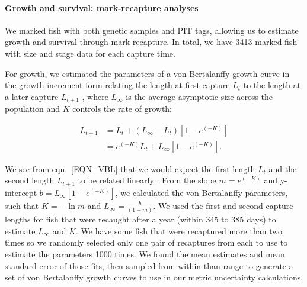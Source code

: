\documentclass[12pt, oneside]{article}   	%
\begin{document}
\paragraph*{Growth and survival: mark-recapture analyses}

We marked fish with both genetic samples and PIT tags, allowing us to estimate growth and survival through mark-recapture. In total, we have 3413 marked fish with size and stage data for each capture time. 

For growth, we estimated the parameters of a von Bertalanffy growth curve \citep{fabens1965properties} in the growth increment form relating the length at first capture $L_t$ to the length at a later capture $L_{t+1}$ \citep{hart2009estimating}, where $L_\infty$ is the average asymptotic size across the population and $K$ controls the rate of growth: %

\begin{equation} \label{EQN_VBL} 
\begin{split}
L_{t+1} & = L_t + (L_\infty - L_t)[1 - e^{(-K)}] \\
 & = e^{(-K)}L_t + L_\infty[1 - e^{(-K)}].
\end{split}
\end{equation}

We see from eqn.\ \ref{EQN_VBL} that we would expect the first length $L_t$ and the second length $L_{t+1}$ to be related linearly \citep{hart2009estimating}. From the slope $m = e^{(-K)}$ and y-intercept $b = L_\infty[1 - e^{(-K)}]$, we calculated the von Bertalanffy parameters, such that $K = -\ln m$ and $L_\infty = \frac{b}{(1-m)}$. We used the first and second capture lengths for fish that were recaught after a year (within 345 to 385 days) to estimate $L_\infty$ and $K$. We have some fish that were recaptured more than two times so we randomly selected only one pair of recaptures from each to use to estimate the parameters 1000 times. We found the mean estimates and mean standard error of those fits, then sampled from within than range to generate a set of von Bertalanffy growth curves to use in our metric uncertainty calculations. 
\end{document}
